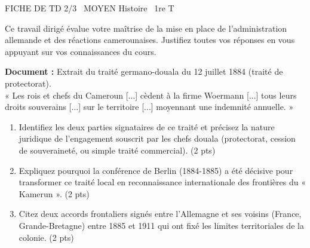 \documentclass[11pt]{article}
\begin{document}
\begin{tcolorbox}[enhanced,colback=popink,colframe=popink,arc=10pt,boxrule=0pt,left=12pt,right=12pt,top=9pt,bottom=9pt]
{\color{white}\popxbold\small FICHE DE TD 2/3 \textbullet\ MOYEN \hfill Histoire \textbullet\ 1re T\par}
\end{tcolorbox}
\vspace{4pt}
Ce travail dirigé évalue votre maîtrise de la mise en place de l'administration allemande et des réactions camerounaises. Justifiez toutes vos réponses en vous appuyant sur vos connaissances du cours.

\begin{exercice}
\textbf{Document :} Extrait du traité germano-douala du 12 juillet 1884 (traité de protectorat).\\
« Les rois et chefs du Cameroun [...] cèdent à la firme Woermann [...] tous leurs droits souverains [...] sur le territoire [...] moyennant une indemnité annuelle. »

\begin{enumerate}
    \item Identifiez les deux parties signataires de ce traité et précisez la nature juridique de l'engagement souscrit par les chefs douala (protectorat, cession de souveraineté, ou simple traité commercial). (2 pts)
    \item Expliquez pourquoi la conférence de Berlin (1884-1885) a été décisive pour transformer ce traité local en reconnaissance internationale des frontières du « Kamerun ». (2 pts)
    \item Citez deux accords frontaliers signés entre l'Allemagne et ses voisins (France, Grande-Bretagne) entre 1885 et 1911 qui ont fixé les limites territoriales de la colonie. (2 pts)
\end{enumerate}
\end{exercice}
\end{document}
